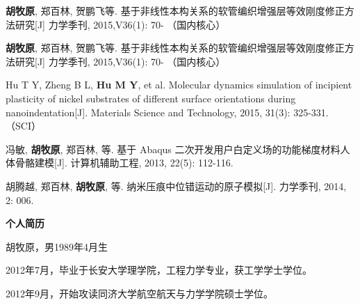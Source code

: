 
\begin{publications}{99}



\item {\bf 胡牧原}, 郑百林, 贺鹏飞等. 基于非线性本构关系的软管编织增强层等效刚度修正方法研究[J]  力学季刊, 2015,V36(1): 70-   （国内核心）
	
\item {\bf 胡牧原}, 郑百林, 贺鹏飞等. 基于非线性本构关系的软管编织增强层等效刚度修正方法研究[J]  力学季刊, 2015,V36(1): 70-   （国内核心）


\item Hu T Y, Zheng B L, {\bf Hu M Y}, et al. Molecular dynamics simulation of incipient plasticity of nickel substrates of different surface orientations during nanoindentation[J]. Materials Science and Technology, 2015, 31(3): 325-331.（SCI）

\item 冯敏, \textbf{胡牧原}, 郑百林, 等. 基于 Abaqus 二次开发用户白定义场的功能梯度材料人体骨骼建模[J]. 计算机辅助工程, 2013, 22(5): 112-116.


\item 胡腾越, 郑百林, \textbf{胡牧原}, 等. 纳米压痕中位错运动的原子模拟[J]. 力学季刊, 2014, 2: 006.	
    
\end{publications}

\textbf{个人简历\LARGE}


胡牧原，男1989年4月生

2012年7月，毕业于长安大学理学院，工程力学专业，获工学学士学位。

2012年9月，开始攻读同济大学航空航天与力学学院硕士学位。
